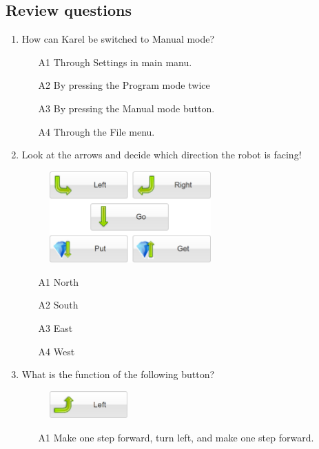 \subsection{Review questions}

\begin{enumerate}
\item How can Karel be switched to Manual mode?
\begin{enumerate}
\item[A1] Through Settings in main manu.
\item[A2] By pressing the Program mode twice
\item[A3] By pressing the Manual mode button.
\item[A4] Through the File menu.
\end{enumerate}
\item Look at  the arrows and decide which direction the robot is facing!
\begin{figure}[!ht]
\begin{center}
\includegraphics[width=6.2cm]{imgk/buttons-all-3.png}
\end{center}
\end{figure}
\begin{enumerate}
\item[A1] North
\item[A2] South
\item[A3] East
\item[A4] West
\end{enumerate}
\item What is the function of the following button?
\begin{figure}[!ht]
\begin{center}
\includegraphics[width=3cm]{imgk/button-left-1.png}
\end{center}
\end{figure}
\begin{enumerate}
\item[A1] Make one step forward, turn left, and make one step forward.

\end{enumerate}
\end{enumerate}
